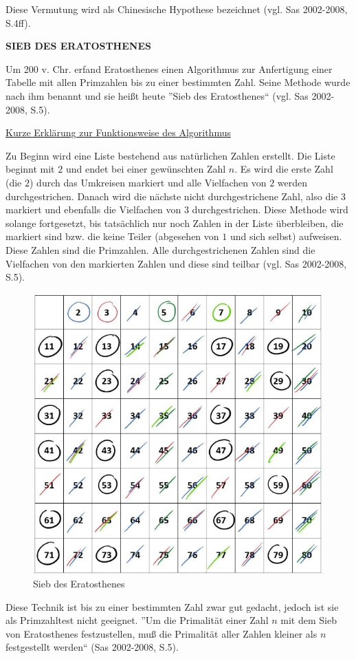 Diese Vermutung wird als Chinesische Hypothese bezeichnet
(vgl. Sas 2002-2008, S.4ff). 
\vspace*{.4cm}

\textbf{SIEB DES ERATOSTHENES}

Um 200 v. Chr. erfand Eratosthenes einen Algorithmus zur
Anfertigung einer Tabelle mit allen Primzahlen bis zu
einer bestimmten Zahl. Seine Methode wurde nach ihm
benannt und sie heißt heute ''Sieb des Eratosthenes``
(vgl. Sas 2002-2008, S.5).
\vspace*{.4cm}

\underline{Kurze Erklärung zur Funktionsweise des Algorithmus}

Zu Beginn wird eine Liste bestehend aus natürlichen Zahlen
erstellt. Die Liste beginnt mit $2$ und endet bei einer
gewünschten Zahl $n$. Es wird die erste Zahl (die $2$)
durch das Umkreisen markiert und alle Vielfachen von $2$
werden durchgestrichen. Danach wird die nächste nicht
durchgestrichene Zahl, also die $3$ markiert und ebenfalls
die Vielfachen von $3$ durchgestrichen. Diese Methode wird
solange fortgesetzt, bis tatsächlich nur noch Zahlen in der
Liste überbleiben, die markiert sind bzw. die keine Teiler
(abgesehen von $1$ und sich selbst) aufweisen. Diese Zahlen
sind die Primzahlen. Alle durchgestrichenen Zahlen sind die
Vielfachen von den markierten Zahlen und diese sind teilbar
(vgl. Sas 2002-2008, S.5).

\begin{figure}[H]
  \centering
  \includegraphics[width=.5\linewidth]{./images/sieb.jpg}
  \caption[Das Sieb des Eratosthenes, 2021]{Sieb des Eratosthenes}
  \label{fig:sieb_eratosthenes}
\end{figure}
\vspace{.2cm}

Diese Technik ist bis zu einer bestimmten Zahl zwar gut
gedacht, jedoch ist sie als Primzahltest nicht geeignet.
''Um die Primalität einer Zahl $n$ mit dem Sieb von
Eratosthenes festzustellen, muß die Primalität aller
Zahlen kleiner als $n$ festgestellt werden``
(Sas 2002-2008, S.5).
\vspace*{.4cm}

